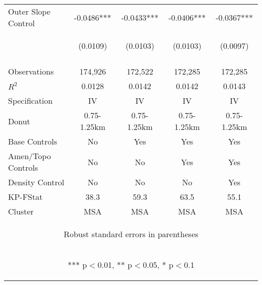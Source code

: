 \begin{tabular}{lcccc}
Outer Slope Control & -0.0486*** & -0.0433*** & -0.0406*** & -0.0367*** \\
 & \begin{footnotesize}(0.0109)\end{footnotesize} & \begin{footnotesize}(0.0103)\end{footnotesize} & \begin{footnotesize}(0.0103)\end{footnotesize} & \begin{footnotesize}(0.0097)\end{footnotesize} \\
\vspace{4pt} & \begin{footnotesize}\end{footnotesize} & \begin{footnotesize}\end{footnotesize} & \begin{footnotesize}\end{footnotesize} & \begin{footnotesize}\end{footnotesize} \\
Observations & 174,926 & 172,522 & 172,285 & 172,285 \\
$R^2$ & 0.0128 & 0.0142 & 0.0142 & 0.0143 \\
Specification & IV & IV & IV & IV \\
Donut & 0.75-1.25km & 0.75-1.25km & 0.75-1.25km & 0.75-1.25km \\
Base Controls & No & Yes & Yes & Yes \\
Amen/Topo Controls & No & No & Yes & Yes \\
Density Control & No & No & No & Yes \\
KP-FStat & 38.3 & 59.3 & 63.5 & 55.1 \\
 Cluster & MSA & MSA & MSA & MSA \\ \hline
\multicolumn{5}{c}{\begin{footnotesize} Robust standard errors in parentheses\end{footnotesize}} \\
\multicolumn{5}{c}{\begin{footnotesize} *** p$<$0.01, ** p$<$0.05, * p$<$0.1\end{footnotesize}} \\
\end{tabular}

